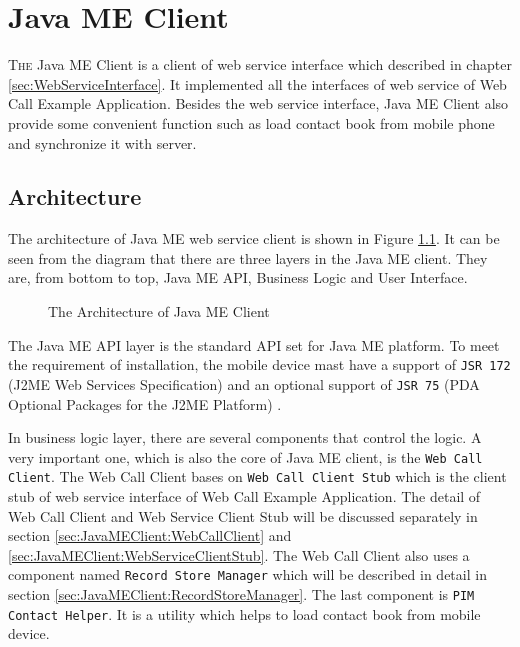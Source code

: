 
\chapter{Java ME Client}
\label{sec:JavaMEClient}

\lettrine[lines=3]{T}{he} Java ME Client is a client of web service interface which described in chapter \nolinebreak \ref{sec:WebServiceInterface}. It implemented all the interfaces of web service of Web Call Example Application. Besides the web service interface, Java ME Client also provide some convenient function such as load contact book from mobile phone and synchronize it with server. 

\section{Architecture}
\label{sec:JavaMEClient:Architecture}

The architecture of Java ME web service client is shown in Figure \nolinebreak \ref{fig:TheArchitectureOfJavaMEClient}. It can be seen from the diagram that there are three layers in the Java ME client. They are, from bottom to top, Java ME API, Business Logic and User Interface. 

\begin{figure}[!hbtp]
\centering
{}
\caption{The Architecture of Java ME Client}
\label{fig:TheArchitectureOfJavaMEClient}
\end{figure}

The Java ME API layer is the standard API set for Java ME platform. To meet the requirement of installation, the mobile device mast have a support of \texttt{JSR 172} (J2ME\texttrademark{} Web Services Specification) \cite{JSR172} and an optional support of \texttt{JSR 75} (PDA Optional Packages for the J2ME Platform) \cite{JSR75}. 

In business logic layer, there are several components that control the logic. A very important one, which is also the core of Java ME client, is the \texttt{Web Call Client}. The Web Call Client bases on \texttt{Web Call Client Stub} which is the client stub of web service interface of Web Call Example Application. The detail of Web Call Client and Web Service Client Stub will be discussed separately in section \ref{sec:JavaMEClient:WebCallClient} and \ref{sec:JavaMEClient:WebServiceClientStub}. The Web Call Client also uses a component named \texttt{Record Store Manager} which will be described in detail in section \ref{sec:JavaMEClient:RecordStoreManager}. The last component is \texttt{PIM Contact Helper}. It is a utility which helps to load contact book from mobile device.


